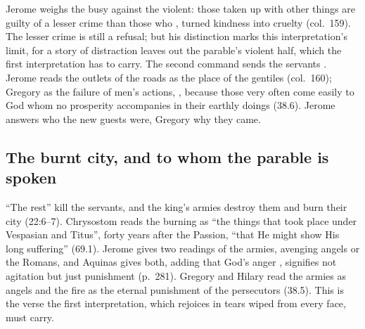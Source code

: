 Jerome weighs the busy against the violent: those taken up with other things
are guilty of a lesser crime than those who , turned kindness into cruelty (col.~159). The lesser crime is
still a refusal; but his distinction marks this interpretation's limit, for a
story of distraction leaves out the parable's violent half, which the first
interpretation has to carry. The second command sends the servants . Jerome reads the outlets of the roads as the place of the
gentiles (col.~160); Gregory as the failure of men's actions, , because those very often come easily to God whom no prosperity
accompanies in their earthly doings (38.6). Jerome answers who the new guests
were, Gregory why they came.

\subsection{The burnt city, and to whom the parable is spoken}

``The rest'' kill the servants, and the king's armies destroy them and burn
their city (22:6--7). Chrysostom reads the burning as ``the things that took
place under Vespasian and Titus'', forty years after the Passion, ``that He
might show His long suffering'' (69.1). Jerome gives two readings of the
armies, avenging angels or the Romans, and Aquinas gives both, adding that
God's anger , signifies not
agitation but just punishment (p.~281). Gregory and Hilary read the armies as
angels and the fire as the eternal punishment of the persecutors (38.5). This
is the verse the first interpretation, which rejoices in tears wiped from
every face, must carry.

